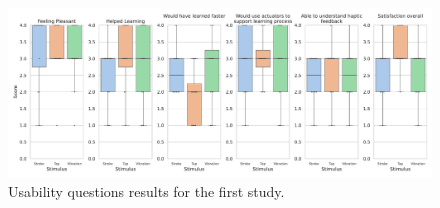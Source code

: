 \begin{table}[ht]
\caption{Results of the Posthock Analyse for the NasaTLX performance dimension with a Wilcoxon test.}
\label{table:nasaTLX_significance_firstStudy_nonParam_PostHock}
\end{table}



\begin{figure}
    \centering
    \includegraphics[width=0.5\linewidth]{src/pictures/Study1Data_questionnaire/questions_special_study1.pdf}
    \caption{Usability questions results for the first study.}
    \label{fig:special_study_first_study}
\end{figure}




